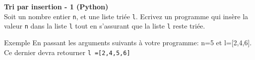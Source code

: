 \begin{Exercice}[10 minutes] \textbf{Tri par insertion - 1 (Python)}\\
    Soit un nombre entier \lstinline{n}, et une liste triée \lstinline{l}. Ecrivez un programme qui insère la valeur \lstinline{n} dans la liste \lstinline{l} tout en s'assurant que la liste \lstinline{l} reste triée.

    

    \begin{Example}{\faTerminal \quad Exemple}
        En passant les arguments suivants à votre programme: n=5 et l=[2,4,6]. Ce dernier devra retourner \lstinline{l =[2,4,5,6]}
    \end{Example}

    \begin{solution}
        
    \end{solution}


\end{Exercice}

